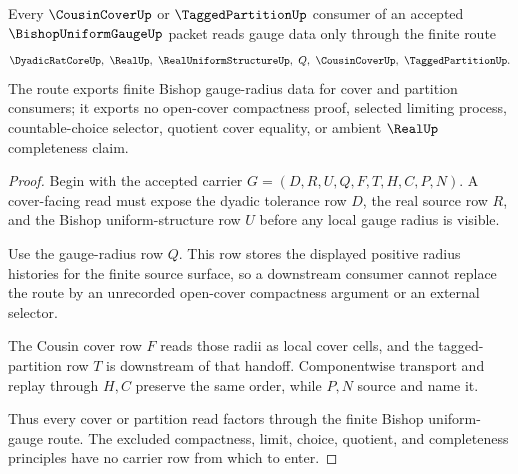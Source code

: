 \begin{theorem}
\label{thm:bishop-uniform-gauge-finite-cover-route}
Every $\CousinCoverUp$ or $\TaggedPartitionUp$ consumer of an accepted $\BishopUniformGaugeUp$ packet reads gauge data only through the finite route
$$
\DyadicRatCoreUp,\ \RealUp,\ \RealUniformStructureUp,\ Q,\ \CousinCoverUp,\ \TaggedPartitionUp .
$$
The route exports finite Bishop gauge-radius data for cover and partition consumers; it exports no open-cover compactness proof, selected limiting process, countable-choice selector, quotient cover equality, or ambient $\RealUp$ completeness claim.
\end{theorem}
\begin{proof}
Begin with the accepted carrier $G=(D,R,U,Q,F,T,H,C,P,N)$. A cover-facing read must expose the dyadic tolerance row $D$, the real source row $R$, and the Bishop uniform-structure row $U$ before any local gauge radius is visible.

Use the gauge-radius row $Q$. This row stores the displayed positive radius histories for the finite source surface, so a downstream consumer cannot replace the route by an unrecorded open-cover compactness argument or an external selector.

The Cousin cover row $F$ reads those radii as local cover cells, and the tagged-partition row $T$ is downstream of that handoff. Componentwise transport and replay through $H,C$ preserve the same order, while $P,N$ source and name it.

Thus every cover or partition read factors through the finite Bishop uniform-gauge route. The excluded compactness, limit, choice, quotient, and completeness principles have no carrier row from which to enter.
\end{proof}


\begin{closurestatus}{\BishopUniformGaugeUp}
  \theoryclosure{\seedClosure}
  \formalstatus{\unformalizedV}
\end{closurestatus}

